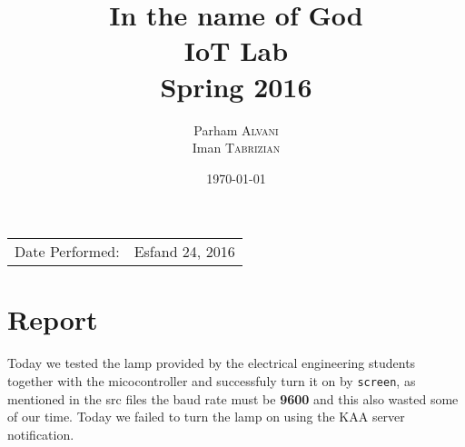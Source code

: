 \documentclass{article}
\title{In the name of God \\ IoT Lab \\ Spring 2016} %
\author{Parham \textsc{Alvani} \\ Iman \textsc{Tabrizian}} %
\date{\today} %
\begin{document}
\maketitle %

\begin{center}
\begin{tabular}{l r}
    Date Performed: & Esfand 24, 2016 \\ %
\end{tabular}
\end{center}



\section{Report}

Today we tested the lamp provided by the electrical engineering students together
with the micocontroller and successfuly turn it on by \texttt{screen}, as mentioned
in the src files the baud rate must be \textbf{9600} and this also wasted some
of our time. Today we failed to turn the lamp on using the KAA server notification.
\end{document}
